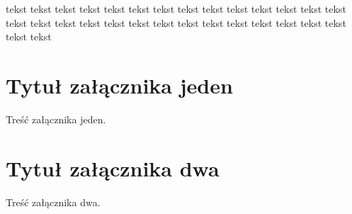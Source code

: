 \documentclass{xmgr}
\begin{document}
tekst tekst tekst tekst tekst tekst tekst tekst tekst tekst tekst tekst tekst tekst tekst
tekst tekst tekst tekst tekst tekst tekst tekst tekst tekst tekst tekst tekst tekst tekst

\appendix
\chapter{Tytuł załącznika jeden}

Treść załącznika jeden.

\chapter{Tytuł załącznika dwa}

Treść załącznika dwa.




\listoftables

\listoffigures

\oswiadczenie
\end{document}
